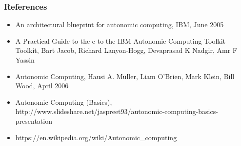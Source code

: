 \documentclass[11pt]{beamer}
\begin{document}
\begin{frame}
\frametitle{References}
\begin{itemize}
\item An architectural blueprint for autonomic computing, IBM, June 2005
\item A Practical Guide to the e to the IBM Autonomic Computing Toolkit Toolkit, Bart Jacob, Richard Lanyon-Hogg, Devaprasad K Nadgir, Amr F Yassin
\item Autonomic Computing, Hausi A. Müller, Liam O’Brien, Mark Klein, Bill Wood, April 2006
\item Autonomic Computing (Basics), http://www.slideshare.net/jaspreet93/autonomic-computing-basics-presentation
\item https://en.wikipedia.org/wiki/Autonomic\_computing
\end{itemize}
\end{frame}
\end{document}
